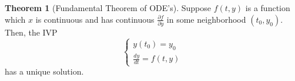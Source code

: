 \documentclass[11pt]{article}
\theoremstyle{definition}
\newtheorem{theorem}{Theorem}[section]
\newcommand{\pder}[2]{\frac{\partial{#1}}{\partial{#2}}}
\newcommand{\der}[2]{\frac{d{#1}}{d{#2}}}
\begin{document}
\section{}
\begin{theorem}[Fundamental Theorem of ODE's]
    Suppose $f(t,y)$ is a function which $x$ is continuous and has
    continuous $\pder{f}{y}$ in some neighborhood $(t_0,y_0)$. Then, the
    IVP $$
    \begin{cases}
        y(t_0) = y_0 \\
        \der{y}{t} = f(t,y)
    \end{cases} $$
    has a unique solution.
\end{theorem}
\end{document}
